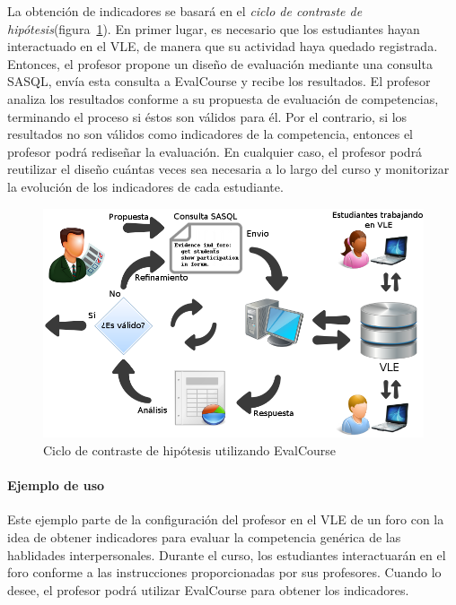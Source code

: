 La obtención de indicadores se basará en el \emph{ciclo de contraste de hipótesis}(figura~\ref{fig:EVCDiagram}). En primer lugar, es necesario que los estudiantes hayan interactuado en el VLE, de manera que su actividad haya quedado registrada. Entonces, el profesor propone un diseño de evaluación mediante una consulta SASQL, envía esta consulta a EvalCourse y recibe los resultados. El profesor analiza los resultados conforme a su propuesta de evaluación de competencias, terminando el proceso si éstos son válidos para él. Por el contrario, si los resultados no son válidos como indicadores de la competencia, entonces el profesor podrá rediseñar la evaluación. En cualquier caso, el profesor podrá reutilizar el diseño cuántas veces sea necesaria a lo largo del curso y monitorizar la evolución de los indicadores de cada estudiante.

\begin{figure}
  \begin{center}
    \includegraphics[scale=0.45]{EvcDiagram.png}
  \end{center}
  \caption{Ciclo de contraste de hipótesis utilizando EvalCourse}
  \label{fig:EVCDiagram}
\end{figure}

\paragraph*{Ejemplo de uso}

Este ejemplo parte de la configuración del profesor en el VLE de un foro con la idea de obtener indicadores para evaluar la competencia genérica de las hablidades interpersonales. Durante el curso, los estudiantes interactuarán en el foro conforme a las instrucciones proporcionadas por sus profesores. Cuando lo desee, el profesor podrá utilizar EvalCourse para obtener los indicadores.

